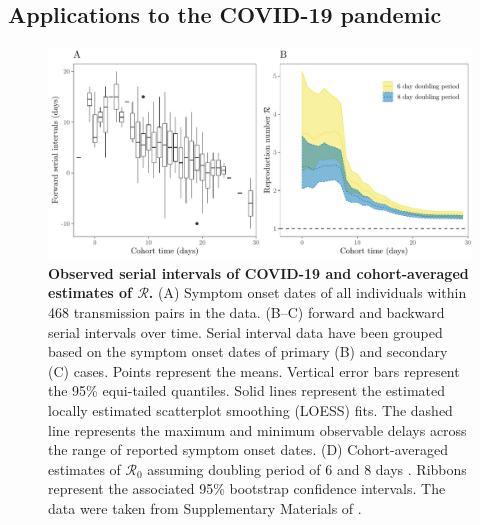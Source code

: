 \documentclass[12pt]{article}
\newcommand{\Rx}[1]{\ensuremath{{\mathcal R}_{#1}}\xspace}
\newcommand{\Ro}{\Rx{0}}
\newcommand{\RR}{\ensuremath{{\mathcal R}}\xspace}
\begin{document}
\subsection{Applications to the COVID-19 pandemic}

\begin{figure}[!th]
\includegraphics[width=\textwidth]{serial_analysis.pdf}
\caption{
\textbf{Observed serial intervals of COVID-19 and cohort-averaged estimates of \RR.}
(A) Symptom onset dates of all individuals within 468 transmission pairs in the data.
(B--C) forward and backward serial intervals over time.
Serial interval data have been grouped based on the symptom onset dates of primary (B) and secondary (C) cases.
Points represent the means. 
Vertical error bars represent the 95\% equi-tailed quantiles.
Solid lines represent the estimated locally estimated scatterplot smoothing (LOESS) fits.
The dashed line represents the maximum and minimum observable delays across the range of reported symptom onset dates.
(D) Cohort-averaged estimates of \Ro assuming doubling period of 6 and 8 days \citep{li2020early, wu2020nowcasting}.
Ribbons represent the associated 95\% bootstrap confidence intervals.
The data were taken from Supplementary Materials of \cite{du2020serial}.
}
\label{fig:du}
\end{figure}
\end{document}
